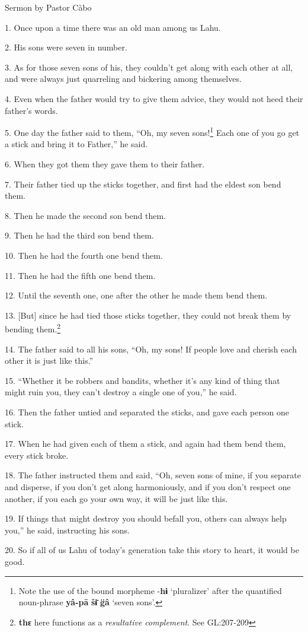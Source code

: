 \setcounter{footnote}{0}

Sermon by Pastor Càbo

1. Once upon a time there was an old man among us Lahu.

2. His sons were seven in number.

3. As for those seven sons of his, they couldn't get along with each other at all,
and were always just quarreling and bickering among themselves.

4. Even when the father would try to give them advice, they would not heed their
father's words.

5. One day the father said to them, ``Oh, my seven sons!\footnote{Note the use of the bound morpheme -\textbf{hɨ} `pluralizer' after the quantified noun-phrase \textbf{yâ-pā} \textbf{šɨ̄} \textbf{g̈â} `seven sons'.} Each one of you go
get a stick and bring it to Father,'' he said.

6. When they got them they gave them to their father.

7. Their father tied up the sticks together, and first had the eldest son bend
them.

8. Then he made the second son bend them.

9. Then he had the third son bend them.

10. Then he had the fourth one bend them.

11. Then he had the fifth one bend them.

12. Until the seventh one, one after the other he made them bend them.

13. [But] since he had tied those sticks together, they could not break them by
bending them.\footnote{\textbf{thɛ} here functions as a \textit{resultative complement}. See GL:207-209}

14. The father said to all his sons, ``Oh, my sons! If people love and cherish
each other it is just like this.''

15. ``Whether it be robbers and bandits, whether it's any kind of thing that might
ruin you, they can't destroy a single one of you,'' he said.

16. Then the father untied and separated the sticks, and gave each person one stick.

17. When he had given each of them a stick, and again had them bend them, every
stick broke.

18. The father instructed them and said, ``Oh, seven sons of mine, if you separate
and disperse, if you don't get along harmoniously, and if you don't respect one
another, if you each go your own way, it will be just like this.

19. If things that might destroy you should befall you, others can always help
you,'' he said, instructing his sons.

20. So if all of us Lahu of today's generation take this story to heart, it would
be good.

